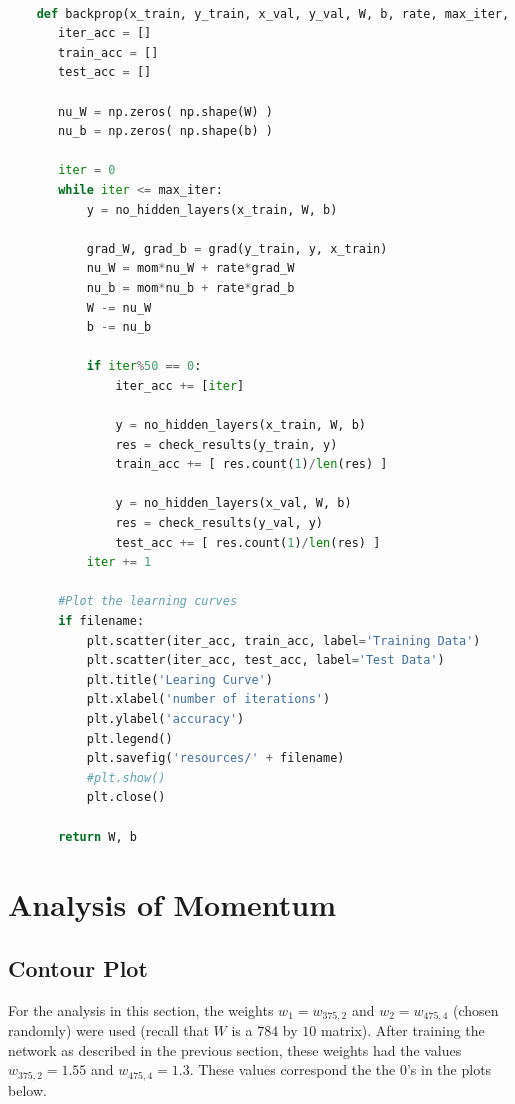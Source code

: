 \documentclass{article}
\begin{document}
  \begin{lstlisting}[language=Python]

    def backprop(x_train, y_train, x_val, y_val, W, b, rate, max_iter, mom=0, filename=''):
       iter_acc = []
       train_acc = []
       test_acc = []

       nu_W = np.zeros( np.shape(W) )
       nu_b = np.zeros( np.shape(b) )

       iter = 0
       while iter <= max_iter:
           y = no_hidden_layers(x_train, W, b)

           grad_W, grad_b = grad(y_train, y, x_train)
           nu_W = mom*nu_W + rate*grad_W
           nu_b = mom*nu_b + rate*grad_b
           W -= nu_W
           b -= nu_b

           if iter%50 == 0:
               iter_acc += [iter]

               y = no_hidden_layers(x_train, W, b)
               res = check_results(y_train, y)
               train_acc += [ res.count(1)/len(res) ]

               y = no_hidden_layers(x_val, W, b)
               res = check_results(y_val, y)
               test_acc += [ res.count(1)/len(res) ]
           iter += 1

       #Plot the learning curves
       if filename:
           plt.scatter(iter_acc, train_acc, label='Training Data')
           plt.scatter(iter_acc, test_acc, label='Test Data')
           plt.title('Learing Curve')
           plt.xlabel('number of iterations')
           plt.ylabel('accuracy')
           plt.legend()
           plt.savefig('resources/' + filename)
           #plt.show()
           plt.close()

       return W, b
   \end{lstlisting}






   \section{Analysis of Momentum}


   \subsection{Contour Plot}
   For the analysis in this section, the weights $w_1 = w_{375,2}$ and $w_2 = w_{475,4}$
   (chosen randomly) were used (recall that $W$ is
   a $784$ by $10$ matrix). After training the network as described in the previous section,
   these weights had the values $w_{375,2} = 1.55$ and $w_{475,4} = 1.3$. These values correspond the the
   $0$'s in the plots below.
\end{document}
